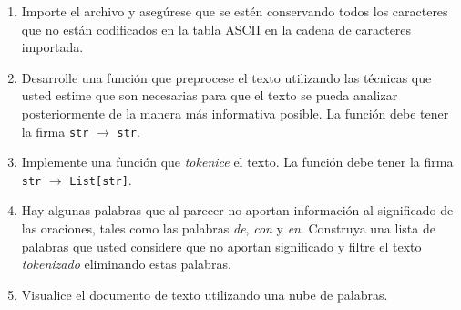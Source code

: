 \documentclass{article}
\begin{document}
\begin{enumerate}
	\item Importe el archivo y asegúrese que se estén conservando todos los caracteres que no están codificados en la tabla ASCII en la cadena de caracteres importada.
	\item Desarrolle una función que preprocese el texto utilizando las técnicas que usted estime que son necesarias para que el texto se pueda analizar posteriormente de la manera más informativa posible. La función debe tener la firma \texttt{str} $\rightarrow$ \texttt{str}.
    \item Implemente una función que \textit{tokenice} el texto. La función debe tener la firma \texttt{str} $\rightarrow$ \texttt{List[str]}.
    \item Hay algunas palabras que al parecer no aportan información al significado de las oraciones, tales como las palabras \textit{de}, \textit{con} y \textit{en}. Construya una lista de palabras que usted considere que no aportan significado y filtre el texto \textit{tokenizado} eliminando estas palabras.
    \item Visualice el documento de texto utilizando una nube de palabras.
\end{enumerate}
\end{document}

